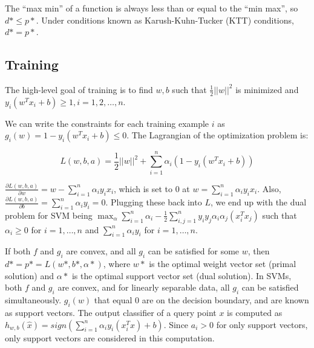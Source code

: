 \documentclass[12pt,titlepage]{article}
\begin{document}
        The ``max min'' of a function is always less than or equal to the ``min max'', so $d* \leq p*$. Under conditions known as Karush-Kuhn-Tucker (KTT)
        conditions, $d* = p*$.

    \subsection{Training}
      The high-level goal of training is to find $w, b$ such that $\frac{1}{2}||w||^2$ is minimized and $y_i(w^Tx_i + b) \geq 1, i = 1, 2, \dots, n$.

      We can write the constraints for each training example $i$ as $g_i(w) = 1 - y_i(w^Tx_i + b) \leq 0$. The Lagrangian of the optimization problem is:

      $$L(w, b, a) = \frac{1}{2}||w||^2 + \sum_{i=1}^n \alpha_i(1 - y_i(w^Tx_i + b))$$

      $\frac{\partial L(w,b,a)}{\partial w} = w - \sum_{i=1}^n \alpha_i y_i x_i$, which is set to 0 at $w = \sum_{i=1}^n \alpha_i y_i x_i$. Also,
      $\frac{\partial L(w,b,a)}{\partial b} = \sum_{i=1}^n \alpha_i y_i = 0$. Plugging these back into $L$, we end up with the dual problem for
      SVM being $\max_{\alpha} \sum_{i=1}^n \alpha_i - \frac{1}{2} \sum_{i,j=1}^n y_i y_j \alpha_i \alpha_j(x_i^T x_j)$ such that $\alpha_i \geq 0$ for
      $i = 1, \dots, n$ and $\sum_{i=1}^n \alpha_i y_i$ for $i = 1, \dots, n$.

      If both $f$ and $g_i$ are convex, and all $g_i$ can be satisfied for some $w$, then $d* = p* = L(w*, b*, \alpha*)$, where $w*$ is the optimal weight
      vector set (primal solution) and $\alpha*$ is the optimal support vector set (dual solution). In SVMs, both $f$ and $g_i$ are convex, and for
      linearly separable data, all $g_i$ can be satisfied simultaneously. $g_i(w)$ that equal 0 are on the decision boundary, and are known as support
      vectors. The output classifier of a query point $x$ is computed as $h_{w,b}(\hat{x}) = sign(\sum_{i=1}^n \alpha_i y_i (x_i^T \hat{x}) + b)$. Since
      $a_i > 0$ for only support vectors, only support vectors are considered in this computation.
\end{document}
